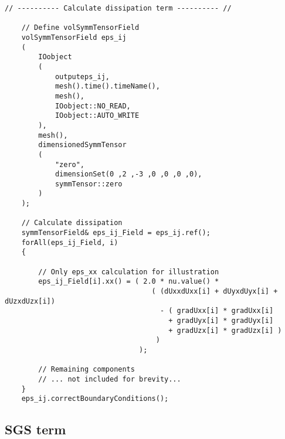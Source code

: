 \begin{lstlisting}[emph={ddt,div,laplacian}]
    // ---------- Calculate dissipation term ---------- //

    // Define volSymmTensorField
    volSymmTensorField eps_ij
    (
        IOobject
        (
            outputeps_ij,
            mesh().time().timeName(),
            mesh(),
            IOobject::NO_READ,
            IOobject::AUTO_WRITE
        ),
        mesh(), 
        dimensionedSymmTensor
        (
            "zero",
            dimensionSet(0 ,2 ,-3 ,0 ,0 ,0 ,0), 
            symmTensor::zero
        )
    );

    // Calculate dissipation
    symmTensorField& eps_ij_Field = eps_ij.ref();
    forAll(eps_ij_Field, i)
    {
        
        // Only eps_xx calculation for illustration
        eps_ij_Field[i].xx() = ( 2.0 * nu.value() * 
                                   ( (dUxxdUxx[i] + dUyxdUyx[i] + dUzxdUzx[i]) 
                                     - ( gradUxx[i] * gradUxx[i] 
                                       + gradUyx[i] * gradUyx[i] 
                                       + gradUzx[i] * gradUzx[i] ) 
                                    ) 
                                );

        // Remaining components
        // ... not included for brevity...
    }
    eps_ij.correctBoundaryConditions();
\end{lstlisting}

\subsection{SGS term}
\label{subsec:SGS_term}

